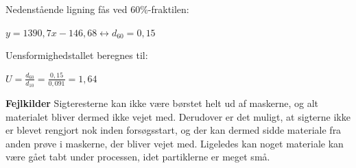 Nedenstående ligning fås ved 60\%-fraktilen:
\begin{center}
	$y = 1390,\!7x - 146,\!68 \leftrightarrow d_{60}=0,\!15$
\end{center}

Uensformighedstallet beregnes til:
\begin{center}
	$U=\frac{d_{60}}{d_{10}} = \frac{0,\!15}{0,\!091} = 1,\!64$
\end{center}

\textbf{Fejlkilder}
\newline
Sigteresterne kan ikke være børstet helt ud af maskerne, og alt materialet bliver dermed ikke vejet med. Derudover er det muligt, at sigterne ikke er blevet rengjort nok inden forsøgsstart, og der kan dermed sidde materiale fra anden prøve i maskerne, der bliver vejet med.
\newline \indent{     }  Ligeledes kan noget materiale kan være gået tabt under processen, idet partiklerne er meget små. 